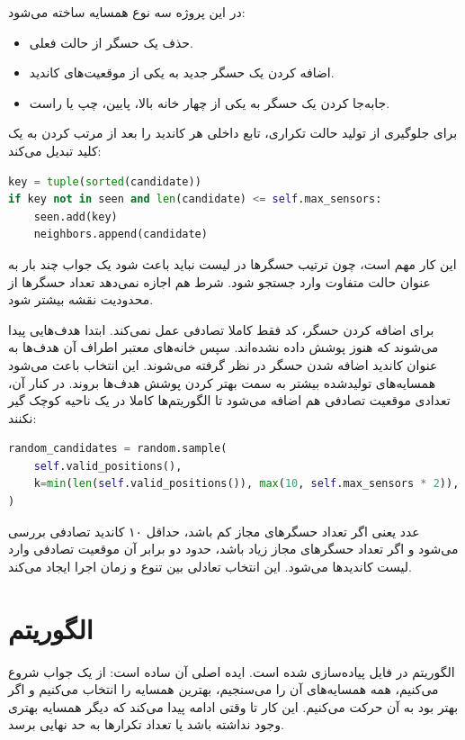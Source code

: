 \documentclass[10.5pt]{exam}
\begin{document}
در این پروژه سه نوع همسایه ساخته می‌شود:

\begin{itemize}
    \item حذف یک حسگر از حالت فعلی.
    \item اضافه کردن یک حسگر جدید به یکی از موقعیت‌های کاندید.
    \item جابه‌جا کردن یک حسگر به یکی از چهار خانه بالا، پایین، چپ یا راست.
\end{itemize}

برای جلوگیری از تولید حالت تکراری، تابع داخلی
هر کاندید را بعد از مرتب کردن به یک کلید تبدیل می‌کند:

\begin{latin}
\begin{lstlisting}[language=Python]
key = tuple(sorted(candidate))
if key not in seen and len(candidate) <= self.max_sensors:
    seen.add(key)
    neighbors.append(candidate)
\end{lstlisting}
\end{latin}

این کار مهم است، چون ترتیب حسگرها در لیست نباید باعث شود یک جواب چند بار به عنوان حالت متفاوت وارد جستجو شود. شرط
هم اجازه نمی‌دهد تعداد حسگرها از محدودیت نقشه بیشتر شود.

برای اضافه کردن حسگر، کد فقط کاملا تصادفی عمل نمی‌کند. ابتدا هدف‌هایی پیدا می‌شوند که هنوز پوشش داده نشده‌اند. سپس خانه‌های معتبر اطراف آن هدف‌ها به عنوان کاندید اضافه شدن حسگر در نظر گرفته می‌شوند. این انتخاب باعث می‌شود همسایه‌های تولیدشده بیشتر به سمت بهتر کردن پوشش هدف‌ها بروند. در کنار آن، تعدادی موقعیت تصادفی هم اضافه می‌شود تا الگوریتم‌ها کاملا در یک ناحیه کوچک گیر نکنند:

\begin{latin}
\begin{lstlisting}[language=Python]
random_candidates = random.sample(
    self.valid_positions(),
    k=min(len(self.valid_positions()), max(10, self.max_sensors * 2)),
)
\end{lstlisting}
\end{latin}

عدد
یعنی اگر تعداد حسگرهای مجاز کم باشد، حداقل ۱۰ کاندید تصادفی بررسی می‌شود و اگر تعداد حسگرهای مجاز زیاد باشد، حدود دو برابر آن موقعیت تصادفی وارد لیست کاندیدها می‌شود. این انتخاب تعادلی بین تنوع و زمان اجرا ایجاد می‌کند.

\section{الگوریتم }
الگوریتم
در فایل
پیاده‌سازی شده است. ایده اصلی آن ساده است: از یک جواب شروع می‌کنیم، همه همسایه‌های آن را می‌سنجیم، بهترین همسایه را انتخاب می‌کنیم و اگر بهتر بود به آن حرکت می‌کنیم. این کار تا وقتی ادامه پیدا می‌کند که دیگر همسایه بهتری وجود نداشته باشد یا تعداد تکرارها به حد نهایی برسد.
\end{document}
